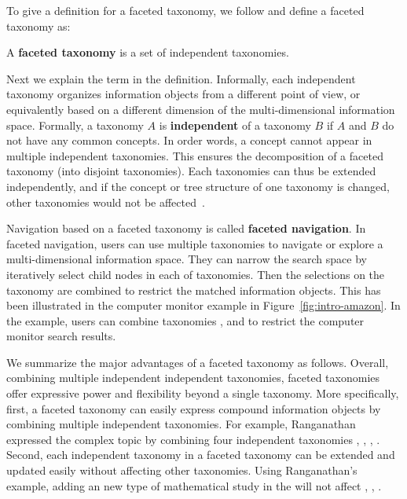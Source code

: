 To give a definition for a faceted taxonomy, we follow \citet{tzitzikas2005compound} and define a faceted taxonomy as:
\begin{definition}
\label{def:ftaxonomy}
 A \textbf{faceted taxonomy} is a set of independent taxonomies.
\end{definition}
\noindent Next we explain the term  in the definition. Informally, each independent taxonomy organizes information objects from a different point of view, or equivalently based on a different dimension of the multi-dimensional information space. Formally, a taxonomy $A$ is \textbf{independent} of a taxonomy $B$ if $A$ and $B$ do not have any common concepts. In order words, a concept cannot appear in multiple independent taxonomies. This ensures the decomposition of a faceted taxonomy (into disjoint taxonomies). Each taxonomies can thus be extended independently, and if the concept or tree structure of one taxonomy is changed, other taxonomies would not be affected~\cite{wei2013survey}. 

Navigation based on a faceted taxonomy is called \textbf{faceted navigation}. In faceted navigation, users can use multiple taxonomies to navigate or explore a multi-dimensional information space. They can narrow the search space by iteratively select child nodes in each of taxonomies. Then the selections on the taxonomy are combined to restrict the matched information objects. This has been illustrated in the computer monitor example in Figure~\ref{fig:intro-amazon}. In the example, users can combine taxonomies ,  and  to restrict the computer monitor search results.


We summarize the major advantages of a faceted taxonomy as follows. Overall, combining multiple independent independent taxonomies, faceted taxonomies offer expressive power and flexibility beyond a single taxonomy. More specifically, first, a faceted taxonomy can easily express compound information objects by combining multiple independent taxonomies.
For example, Ranganathan expressed the complex topic  by combining four independent taxonomies , , , . Second, each independent taxonomy in a faceted taxonomy can be extended and updated easily without affecting other taxonomies. Using Ranganathan's example, adding an new type of mathematical study in the  will not affect , , .

